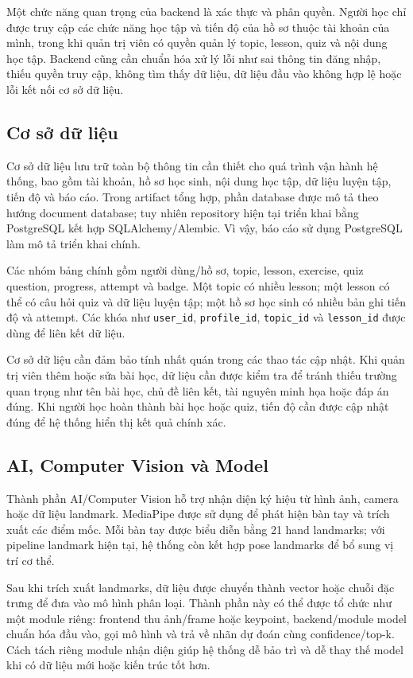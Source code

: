 \documentclass[conference]{IEEEtran}
\begin{document}
Một chức năng quan trọng của backend là xác thực và phân quyền. Người học chỉ được truy cập các chức năng học tập và tiến độ của hồ sơ thuộc tài khoản của mình, trong khi quản trị viên có quyền quản lý topic, lesson, quiz và nội dung học tập. Backend cũng cần chuẩn hóa xử lý lỗi như sai thông tin đăng nhập, thiếu quyền truy cập, không tìm thấy dữ liệu, dữ liệu đầu vào không hợp lệ hoặc lỗi kết nối cơ sở dữ liệu.

\subsection{Cơ sở dữ liệu}
Cơ sở dữ liệu lưu trữ toàn bộ thông tin cần thiết cho quá trình vận hành hệ thống, bao gồm tài khoản, hồ sơ học sinh, nội dung học tập, dữ liệu luyện tập, tiến độ và báo cáo. Trong artifact tổng hợp, phần database được mô tả theo hướng document database; tuy nhiên repository hiện tại triển khai bằng PostgreSQL kết hợp SQLAlchemy/Alembic. Vì vậy, báo cáo sử dụng PostgreSQL làm mô tả triển khai chính.

Các nhóm bảng chính gồm người dùng/hồ sơ, topic, lesson, exercise, quiz question, progress, attempt và badge. Một topic có nhiều lesson; một lesson có thể có câu hỏi quiz và dữ liệu luyện tập; một hồ sơ học sinh có nhiều bản ghi tiến độ và attempt. Các khóa như \texttt{user\_id}, \texttt{profile\_id}, \texttt{topic\_id} và \texttt{lesson\_id} được dùng để liên kết dữ liệu.

Cơ sở dữ liệu cần đảm bảo tính nhất quán trong các thao tác cập nhật. Khi quản trị viên thêm hoặc sửa bài học, dữ liệu cần được kiểm tra để tránh thiếu trường quan trọng như tên bài học, chủ đề liên kết, tài nguyên minh họa hoặc đáp án đúng. Khi người học hoàn thành bài học hoặc quiz, tiến độ cần được cập nhật đúng để hệ thống hiển thị kết quả chính xác.

\subsection{AI, Computer Vision và Model}
Thành phần AI/Computer Vision hỗ trợ nhận diện ký hiệu từ hình ảnh, camera hoặc dữ liệu landmark. MediaPipe được sử dụng để phát hiện bàn tay và trích xuất các điểm mốc. Mỗi bàn tay được biểu diễn bằng 21 hand landmarks; với pipeline landmark hiện tại, hệ thống còn kết hợp pose landmarks để bổ sung vị trí cơ thể.

Sau khi trích xuất landmarks, dữ liệu được chuyển thành vector hoặc chuỗi đặc trưng để đưa vào mô hình phân loại. Thành phần này có thể được tổ chức như một module riêng: frontend thu ảnh/frame hoặc keypoint, backend/module model chuẩn hóa đầu vào, gọi mô hình và trả về nhãn dự đoán cùng confidence/top-k. Cách tách riêng module nhận diện giúp hệ thống dễ bảo trì và dễ thay thế model khi có dữ liệu mới hoặc kiến trúc tốt hơn.
\end{document}
